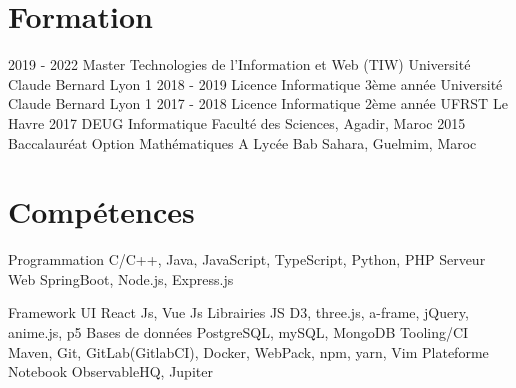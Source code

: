 \documentclass[]{friggeri-cv}
\begin{document}


\vspace{-0.35cm}
\section{Formation}

\begin{entrylist}
    \entry
        {2019 - 2022}
        {Master {\normalfont Technologies de l'Information et Web (TIW)}}
        {}
        {Université Claude Bernard Lyon 1}
    \entry
        {2018 - 2019}
        {Licence \normalfont Informatique }
        {3ème année}
        {Université Claude Bernard Lyon 1}
    \entry
        {2017 - 2018}
        {Licence \normalfont Informatique }
        {2ème année}
        {UFRST Le Havre}
    \entry
        {2017}
        {DEUG \normalfont Informatique }
        {}
        {Faculté des Sciences, Agadir, Maroc}
    \entry
        {2015}
        {Baccalauréat \normalfont Option Mathématiques A }
        {}
        {Lycée Bab Sahara, Guelmim, Maroc}
    
\end{entrylist}

\vspace{-0.35cm}

\section{Compétences}
\vspace{-0.35cm}
\begin{entrylist}

    \vspace{-0.3cm}
  \entry
    {Programmation}
    {    C/C++, Java, JavaScript, TypeScript, Python, PHP}
    {}
    {}
    \vspace{-0.3cm}
  \entry
    {Serveur Web}
    {    SpringBoot, Node.js, Express.js}
    {}
    {}
    
    \vspace{-0.3cm}
  \entry
    {Framework UI}
    {    React Js, Vue Js}
    {}
    {}
    \vspace{-0.3cm}
  \entry
    {Librairies JS}
    {    D3, three.js, a-frame, jQuery, anime.js, p5}
    {}
    {}
    \vspace{-0.3cm}
  \entry
    {Bases de données}
    {    PostgreSQL, mySQL, MongoDB}
    {}
    {}
    \vspace{-0.3cm}
  \entry
    {Tooling/CI}
    {    Maven, Git, GitLab(GitlabCI), Docker, WebPack, npm, yarn, Vim}
    {}
    {}
  \entry
    {Plateforme Notebook}
    {    ObservableHQ, Jupiter}
    {}
    {}
\end{entrylist}
\end{document}

